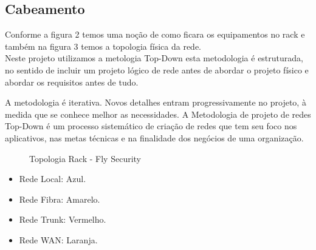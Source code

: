 \documentclass[	DIV=calc,%
							paper=a4,%
							fontsize=12pt,%
							onecolumn]{scrartcl}	 					%
\begin{document}
\subsection{Cabeamento}

Conforme a figura 2 temos uma noção de como ficara os equipamentos no rack e também na figura 3 temos a  topologia física da rede.
\\

Neste projeto utilizamos a metologia Top-Down esta metodologia é estruturada, no sentido de incluir um projeto lógico de rede antes de abordar o projeto físico e abordar os requisitos antes de tudo.

A metodologia é iterativa. Novos detalhes entram progressivamente no projeto, à medida que se conhece melhor as necessidades. A Metodologia de projeto de redes Top-Down é um processo sistemático de criação de redes que tem seu foco nos aplicativos, nas metas técnicas e na finalidade dos negócios de uma organização.

\begin{figure}[H]
	\noindent{}
	\caption{Topologia Rack - Fly Security}
	\label{tprack}
\end{figure}

\begin{itemize}
	\item Rede Local: Azul.
	\item Rede Fibra: Amarelo. 
	\item Rede Trunk: Vermelho. 
	\item Rede WAN:   Laranja.
\end{itemize}
\end{document}
